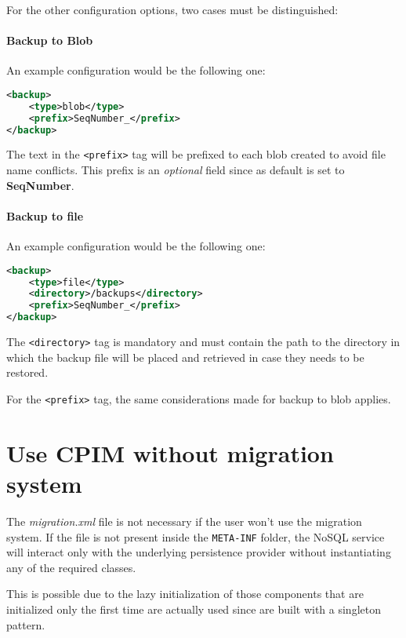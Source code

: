 \newparagraph For the other configuration options, two cases must be distinguished:

\paragraph{Backup to Blob} An example configuration would be the following one:
\begin{lstlisting}[language=XML, caption=Backup to blob]
<backup>
    <type>blob</type>
    <prefix>SeqNumber_</prefix>
</backup>
\end{lstlisting}

\noindent The text in the \texttt{<prefix>} tag will be prefixed to each blob created to avoid file name conflicts.
This prefix is an \textit{optional} field since as default is set to \textbf{SeqNumber\textunderscore}.

\paragraph{Backup to file} An example configuration would be the following one:
\begin{lstlisting}[language=XML, caption=Backup to file]
<backup>
    <type>file</type>
    <directory>/backups</directory>
    <prefix>SeqNumber_</prefix>
</backup>
\end{lstlisting}

\noindent The \texttt{<directory>} tag is mandatory and must contain the path to the directory in which the backup file will be placed and retrieved in case they needs to be restored.

\noindent For the \texttt{<prefix>} tag, the same considerations made for backup to blob applies.

\section{Use CPIM without migration system}
The \textit{migration.xml} file is not necessary if the user won't use the migration system. If the file is not present inside the \texttt{META-INF} folder, the NoSQL service will interact only with the underlying persistence provider without instantiating any of the required classes.

\noindent This is possible due to the lazy initialization of those components that are initialized only the first time are actually used since are built with a singleton pattern.